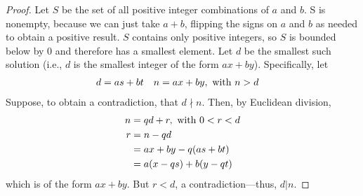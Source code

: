\documentclass[10pt]{article}
\theoremstyle{definition}
\begin{document}
\begin{proof}
Let $S$ be the set of all positive integer combinations of $a$ and $b$.  S is nonempty, because we can just take $a+b$, flipping the signs on $a$ and $b$ as needed to obtain a positive result.  $S$ contains only positive integers, so $S$ is bounded below by 0 and therefore has a smallest element.  Let $d$ be the smallest such solution (i.e., $d$ is the smallest integer of the form $ax+by$).  Specifically, let 
\begin{align*}
d &= as+bt & n &= ax+by, ~\textnormal{with } n>d
\end{align*}
Suppose, to obtain a contradiction, that $d\nmid n$.  Then, by Euclidean division, 
\begin{align*}
n &= qd+r, \textnormal{ with } 0<r<d\\ 
r &= n-qd \\ 
&= ax+by-q(as+bt) \\ 
&= a(x-qs) + b(y-qt)
\end{align*}
which is of the form $ax+by$.  But $r<d$, a contradiction---thus, $d|n$.  
\end{proof}
\end{document}
